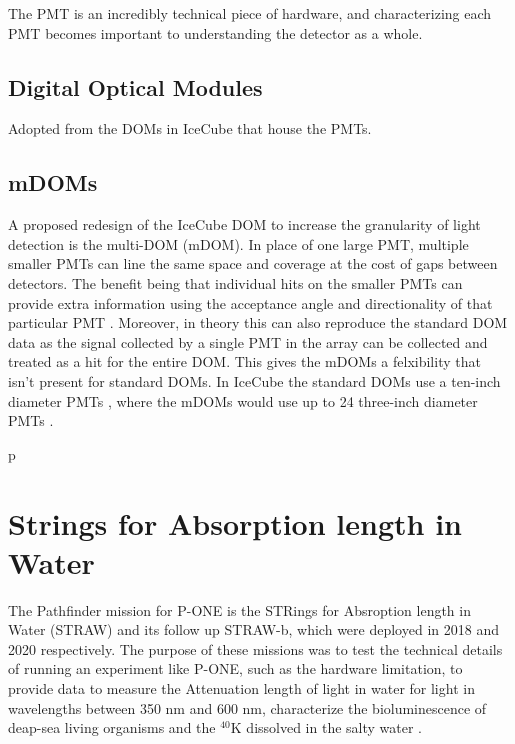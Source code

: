 The PMT is an incredibly technical piece of hardware, and characterizing each PMT becomes important to understanding the detector as a whole. 

\subsection{Digital Optical Modules}

Adopted from the DOMs in IceCube that house the PMTs.

\subsection{mDOMs}

A proposed redesign of the IceCube DOM to increase the granularity of light detection is the multi-DOM (mDOM). In place of one large PMT, multiple smaller PMTs can line the same space and coverage at the cost of gaps between detectors. The benefit being that individual hits on the smaller PMTs can provide extra information using the acceptance angle and directionality of that particular PMT \cite{mpmt}. Moreover, in theory this can also reproduce the standard DOM data as the signal collected by a single PMT in the array can be collected and treated as a hit for the entire DOM. This gives the mDOMs a felxibility that isn't present for standard DOMs. In IceCube the standard DOMs use a ten-inch diameter PMTs \cite{icecube}, where the mDOMs would use up to 24 three-inch diameter PMTs \cite{mpmt}.

p\section{Strings for Absorption length in Water}

The Pathfinder mission for P-ONE is the STRings for Absroption length in Water (STRAW) and its follow up STRAW-b, which were deployed in 2018 and 2020 respectively. The purpose of these missions was to test the technical details of running an experiment like P-ONE, such as the hardware limitation, to provide data to measure the Attenuation length of light in water for light in wavelengths between 350 nm and 600 nm, characterize the bioluminescence of deap-sea living organisms and the $^{40}$K dissolved in the salty water \cite{straw}.


